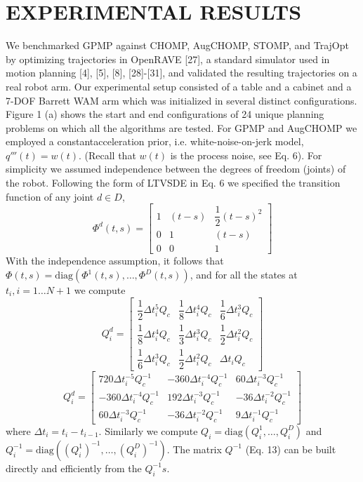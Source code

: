 \documentclass{IEEEtran}
\begin{document}
\section{EXPERIMENTAL RESULTS}
We benchmarked GPMP against CHOMP, AugCHOMP,
STOMP, and TrajOpt by optimizing trajectories in OpenRAVE [27], a standard simulator used in motion planning [4],
[5], [8], [28]-[31], and validated the resulting trajectories
on a real robot arm. Our experimental setup consisted of a
table and a cabinet and a 7-DOF Barrett WAM arm which
was initialized in several distinct configurations. Figure 1 (a)
shows the start and end configurations of 24 unique planning
problems on which all the algorithms are tested.
For GPMP and AugCHOMP we employed a constantacceleration prior, i.e. white-noise-on-jerk model, $q'''(t)=w(t)$. (Recall that $w(t)$ is the process noise, see Eq. 6). For
simplicity we assumed independence between the degrees of
freedom (joints) of the robot. Following the form of LTVSDE in Eq. 6 we specified the transition function of any joint
$d \in D$,
\[
\Phi^d(t,s)=\begin{bmatrix}
1&(t-s)&\dfrac{1}{2}(t-s)^2\\
0&1&(t-s)\\
0&0&1
\tag{37}
\end{bmatrix}
\]
With the independence assumption, it follows that $\Phi(t, s) =
\text{diag}(\Phi^1
(t, s), \dots , \Phi^
D(t, s))$, and for all the states at $t_i
, i =
1 \dots N + 1$ we compute
\[
Q^d_i=\begin{bmatrix}
\dfrac{1}{2}\Delta t_i^5Q_c&\dfrac{1}{8}\Delta t_i^4Q_c&\dfrac{1}{6}\Delta t_i^3Q_c\\
\dfrac{1}{8}\Delta t_i^4Q_c&\dfrac{1}{3}\Delta t_i^3Q_c&\dfrac{1}{2}\Delta t_i^2Q_c\\
\dfrac{1}{6}\Delta t_i^3Q_c&\dfrac{1}{2}\Delta t_i^2Q_c&\Delta t_iQ_c
\end{bmatrix}
\]
\[
Q^d_i=\begin{bmatrix}
720\Delta t_i^{-5}Q_c^{-1}&-360\Delta t_i^{-4}Q_c^{-1}&60\Delta t_i^{-3}Q_c^{-1}\\
-360\Delta t_i^{-4}Q_c^{-1}&192\Delta t_i^{-3}Q_c^{-1}&-36\Delta t_i^{-2}Q_c^{-1}\\
60\Delta t_i^{-3}Q_c^{-1}&-36\Delta t_i^{-2}Q_c^{-1}&9\Delta t_i^{-1}Q_c^{-1}
\tag{38}
\end{bmatrix}
\]
where $\Delta t_i=t_i-t_{i-1}$. Similarly we compute $Q_i =\text{diag}(Q_i^1
, \dots, Q^D_i
)$ and $ Q_i^{-1}= \text{diag}((Q_i^{1})^{-1}
, \dots,(Q^D_i)^{-1})$.
The matrix $Q^{-1}$
(Eq. 13) can be built directly and efficiently
from the $Q_i^{-1}s$.
\end{document}

